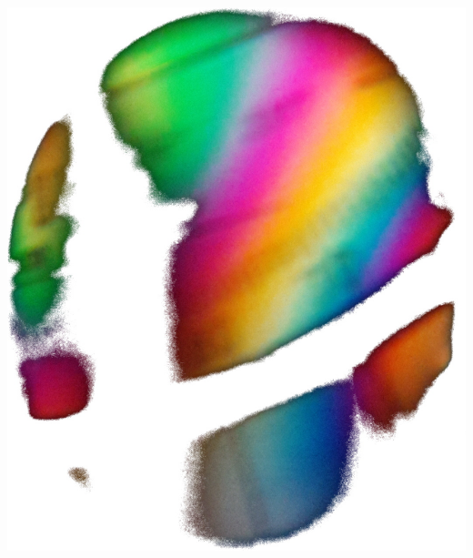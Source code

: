 

\hypersetup{
	pdftitle=
}

\title{}
\author{
	Martin Ueding \\
	\small{\href{mailto:mu@martin-ueding.de}{mu@martin-ueding.de}}
}

\pagestyle{empty}



\includegraphics[height=0.3\textheight]{Geodreieck.jpg}
\hfill
